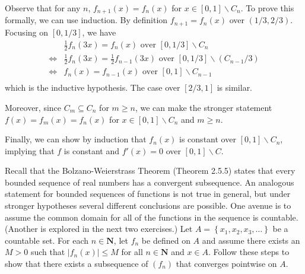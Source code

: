 \begin{solution}
{  Observe that for any \(n\), \(f_{n+1}(x) = f_n(x)\) for \(x \in [0,1]\backslash C_n\). To prove this formally, we can use induction. By definition \(f_{n+1} = f_n(x)\) over \((1/3, 2/3)\). Focusing on \([0, 1/3]\), we have
\begin{align*}
   &\frac{1}{2} f_n(3x) = f_n(x) \text{ over } [0,1/3] \backslash C_n\\
   \Longleftrightarrow &\frac{1}{2} f_n(3x) = \frac{1}{2}f_{n-1}(3x) \text{ over } [0, 1/3] \backslash \left(C_{n-1} / 3\right)\\
   \Longleftrightarrow & f_n(x) = f_{n-1}(x) \text{ over } [0,1] \backslash C_{n-1}\\
\end{align*}
which is the inductive hypothesis. The case over \([2/3, 1]\) is similar.

Moreover, since \(C_m \subseteq C_n\) for \(m \geq n\), we can make the stronger statement \(f(x) = f_{m}(x) = f_n(x)\) for \(x \in [0,1]\backslash C_n\) and \(m \geq n\).

Finally, we can show by induction that \(f_n(x)\) is constant over \([0,1]\backslash C_n\), implying that \(f\) is constant and \(f'(x) = 0\) over \([0,1] \backslash C\).
  }
  
\end{solution}
\begin{exercise}
  Recall that the Bolzano-Weierstrass Theorem (Theorem 2.5.5) states that every bounded sequence of real numbers has a convergent subsequence. An analogous statement for bounded sequences of functions is not true in general, but under stronger hypotheses several different conclusions are possible. One avenue is to assume the common domain for all of the functions in the sequence is countable. (Another is explored in the next two exercises.)
  Let $A=\left\{x_{1}, x_{2}, x_{3}, \ldots\right\}$ be a countable set. For each $n \in \mathbf{N}$, let $f_{n}$ be defined on $A$ and assume there exists an $M>0$ such that $\left|f_{n}(x)\right| \leq M$ for all $n \in \mathbf{N}$ and $x \in A$. Follow these steps to show that there exists a subsequence of $\left(f_{n}\right)$ that converges pointwise on $A$.

\end{exercise}
